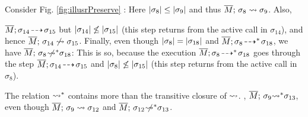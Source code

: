 Consider    Fig. \ref{fig:illusrPreserve} :
Here $|\sigma_8| \leq |\sigma_9|$ and thus $\overline{M};\, {\sigma_8} \rightsquigarrow \sigma_9$. Also,  {$\overline{M};\sigma_{14}\! \dashrightarrow\! {\sigma_{15}}$  but  $|\sigma_{14}| \not\leq |\sigma_{15}| $  (this step returns from the active call in $\sigma_{14}$), and hence   $\overline{M};\, {\sigma_{14}} \not\rightsquigarrow \sigma_{15}$. 
Finally, even though $|\sigma_8| = |\sigma_{18}|$
 and $\overline{M};\sigma_8\! \dashrightarrow^*\! {\sigma_{18}}$, we have  
 $\overline{M};\, {\sigma_8} \not\!\!\!{\rightsquigarrow^*} \sigma_{18}$:
This is so, because the execution $\overline{M};\sigma_8\! \dashrightarrow^*\! {\sigma_{18}}$ goes through the step
$\overline{M};\sigma_{14}\! \dashrightarrow\! {\sigma_{15}}$ and  $|\sigma_{8}| \not\leq |\sigma_{15}| $
 (this step returns from the active call in  $\sigma_8$).

\vspace{.1cm}
{The relation ${\rightsquigarrow^*}$ contains more than the transitive closure of  $\rightsquigarrow$.
\Eg, ${\overline{M};\, {\sigma_9} {\rightsquigarrow^*} \sigma_{13}}$, even though ${\overline{M};\, {\sigma_{9}} \rightsquigarrow \sigma_{12}}$  and ${\overline{M};\, {\sigma_{12}} \not\!\!\!{\rightsquigarrow^*} \sigma_{13}}$.} 
%




\begin{lemma}
\label{l:params:do:not:change} 
 
\end{lemma}
 






}
